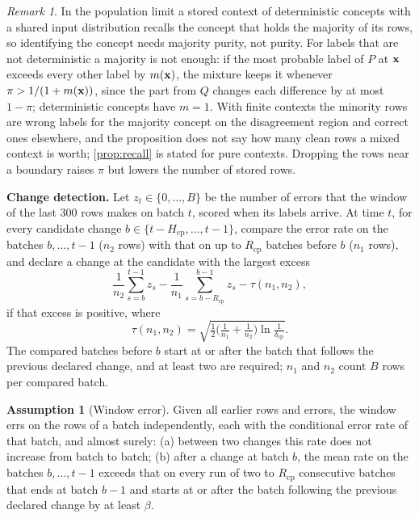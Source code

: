 \documentclass[11pt]{article}
\theoremstyle{plain}
\theoremstyle{definition}
\newtheorem{assumption}{Assumption}
\theoremstyle{remark}
\newtheorem{remark}{Remark}
\begin{document}
\begin{remark}
In the population limit a stored context of deterministic concepts with a shared input distribution recalls the
concept that holds the majority of its rows, so identifying the concept needs majority purity, not purity. For labels that are not deterministic a
majority is not enough: if the most probable label of $P$ at $\mathbf{x}$ exceeds every other label by $m(\mathbf{x})$, the mixture
keeps it whenever $\pi>1/(1+m(\mathbf{x}))$, since the part from $Q$ changes each difference by at most $1-\pi$;
deterministic concepts have $m=1$. With finite contexts the minority rows are wrong labels for the majority concept on
the disagreement region and correct ones elsewhere, and the proposition does not say how many clean rows a mixed
context is worth; \cref{prop:recall} is stated for pure contexts. Dropping the rows near a boundary raises $\pi$ but
lowers the number of stored rows.
\end{remark}

\textbf{Change detection.} Let $z_t\in\{0,\dots,B\}$ be the number of errors that the window of the last 300 rows
makes on batch $t$, scored when its labels arrive. At time $t$, for every candidate change $b\in\{t-H_{\mathrm{cp}},
\dots,t-1\}$, compare the error rate on the batches $b,\dots,t-1$ ($n_2$ rows) with that on up to $R_{\mathrm{cp}}$
batches before $b$ ($n_1$ rows), and declare a change at the candidate with the largest excess
\begin{equation}\label{eq:cp}
  \frac{1}{n_2}\sum_{s=b}^{t-1}z_s-\frac{1}{n_1}\sum_{s=b-R_{\mathrm{cp}}}^{b-1}z_s-\tau(n_1,n_2),
\end{equation}
if that excess is positive, where
\[
  \tau(n_1,n_2)=\sqrt{\tfrac12\bigl(\tfrac1{n_1}+\tfrac1{n_2}\bigr)\ln\tfrac1{\delta_{\mathrm{cp}}}} .
\] The compared batches before $b$ start at or after the batch that follows the previous
declared change, and at least two are required; $n_1$ and $n_2$ count $B$ rows per compared batch.

\begin{assumption}[Window error]\label{ass:err}
Given all earlier rows and errors, the window errs on the rows of a batch independently, each with the conditional
error rate of that batch, and almost surely: (a) between two changes this rate does not increase from batch to batch;
(b) after a change at batch $b$, the mean rate on the batches $b,\dots,t-1$ exceeds that on every run of two to
$R_{\mathrm{cp}}$ consecutive batches that ends at batch $b-1$ and starts at or after the batch following the
previous declared change by at least $\beta$.
\end{assumption}
\end{document}
